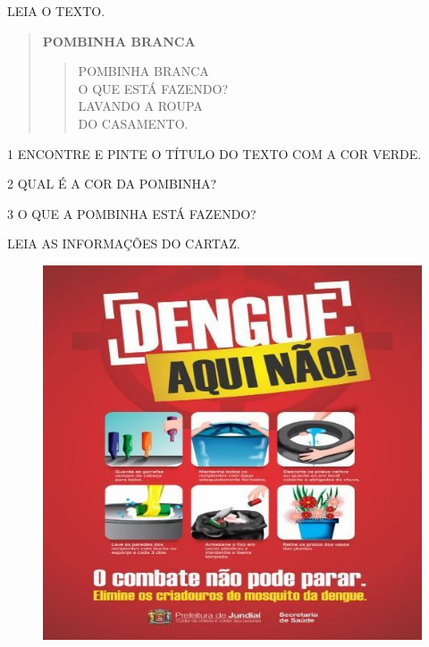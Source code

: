 LEIA O TEXTO.

\begin{quote}
\textbf{POMBINHA BRANCA}

\begin{verse}
POMBINHA BRANCA\\
O QUE ESTÁ FAZENDO?\\
LAVANDO A ROUPA\\
DO CASAMENTO.
\end{verse}

\end{quote}


\num{1} ENCONTRE E PINTE O TÍTULO DO TEXTO COM A COR VERDE.


\num{2} QUAL É A COR DA POMBINHA?


\num{3} O QUE A POMBINHA ESTÁ FAZENDO?


\pagebreak
LEIA AS INFORMAÇÕES DO CARTAZ.

\begin{figure}[htpb!]
\centering
\includegraphics[width=.8\textwidth]{media/image127.jpg}
\end{figure}


